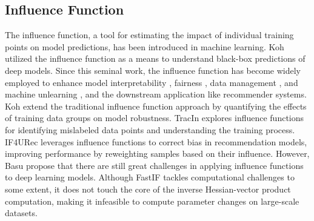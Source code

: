 \subsection{Influence Function}
The influence function, a tool for estimating the impact of individual training points on model predictions, has been introduced in machine learning.
Koh \etal \cite{koh2017understanding} utilized the influence function as a means to understand black-box predictions of deep models. Since this seminal work, the influence function has become widely employed to enhance model interpretability \cite{chhabra2024data,basu2020second}, fairness \cite{li2022achieving,wang2024fairif}, data management \cite{hara2019data}, and machine unlearning \cite{chen2024fast, liu2023muter}, and the downstream application like recommender systems\cite{cheng2018explaining, guo2024counterfactual,li2023selective}. Koh \etal \cite{koh2019accuracy} extend the traditional influence function approach by quantifying the effects of training data groups on model robustness. TracIn \cite{pruthi2020estimating} explores influence functions for identifying mislabeled data points and understanding the training process. IF4URec \cite{yu2020influence} leverages influence functions to correct bias in recommendation models, improving performance by reweighting samples based on their influence.
However, Basu \etal \cite{basu2020influence} propose that there are still great challenges in applying influence functions to deep learning models. Although FastIF \cite{guo2020fastif} tackles computational challenges to some extent, it does not touch the core of the inverse Hessian-vector product computation, making it infeasible to compute parameter changes on large-scale datasets.